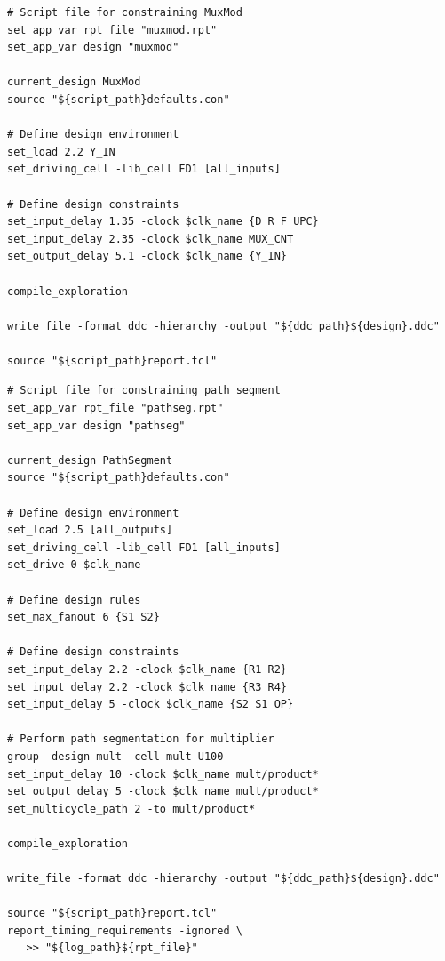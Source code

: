 \begin{lstlisting}[caption={muxmod.tcl},label=ex:muxmod-tcl]
# Script file for constraining MuxMod
set_app_var rpt_file "muxmod.rpt"
set_app_var design "muxmod"

current_design MuxMod
source "${script_path}defaults.con"

# Define design environment
set_load 2.2 Y_IN
set_driving_cell -lib_cell FD1 [all_inputs]

# Define design constraints
set_input_delay 1.35 -clock $clk_name {D R F UPC}
set_input_delay 2.35 -clock $clk_name MUX_CNT
set_output_delay 5.1 -clock $clk_name {Y_IN}

compile_exploration

write_file -format ddc -hierarchy -output "${ddc_path}${design}.ddc"

source "${script_path}report.tcl"
\end{lstlisting}

\begin{lstlisting}[caption={pathseg.tcl},label=ex:pathseg-tcl]
# Script file for constraining path_segment
set_app_var rpt_file "pathseg.rpt"
set_app_var design "pathseg"

current_design PathSegment
source "${script_path}defaults.con"

# Define design environment
set_load 2.5 [all_outputs]
set_driving_cell -lib_cell FD1 [all_inputs]
set_drive 0 $clk_name

# Define design rules
set_max_fanout 6 {S1 S2}

# Define design constraints
set_input_delay 2.2 -clock $clk_name {R1 R2}
set_input_delay 2.2 -clock $clk_name {R3 R4}
set_input_delay 5 -clock $clk_name {S2 S1 OP}

# Perform path segmentation for multiplier
group -design mult -cell mult U100
set_input_delay 10 -clock $clk_name mult/product*
set_output_delay 5 -clock $clk_name mult/product*
set_multicycle_path 2 -to mult/product*

compile_exploration

write_file -format ddc -hierarchy -output "${ddc_path}${design}.ddc"

source "${script_path}report.tcl"
report_timing_requirements -ignored \
   >> "${log_path}${rpt_file}"
\end{lstlisting}

